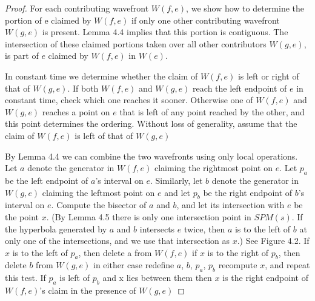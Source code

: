 \begin{proof}
	For each contributing wavefront $W(f,e)$, we show how to determine the
	portion of e claimed by $W(f,e)$ if only one other contributing wavefront
	$W(g,e)$ is present. Lemma 4.4 implies that this portion is contiguous. The
	intersection of these  claimed portions taken over all other contributors
	$W(g,e)$, is part of $e$ claimed by $W(f,e)$ in $W(e)$.

	In constant time we determine whether the claim of $W(f,e)$ is left or right
	of that of $W(g,e)$. If both $W(f,e)$ and $W(g,e)$ reach the left endpoint
	of $e$ in constant time, check which one reaches it sooner. Otherwise one of
	$W(f,e)$ and $W(g,e)$ reaches a point on $e$ that is left of any point
	reached by the other, and this point determines the ordering. Without loss
	of generality, assume that the claim of $W(f,e)$ is left of that of $W(g,e)$

	By Lemma 4.4 we can combine the two wavefronts using only local operations.
	Let $a$ denote the generator in $W(f,e)$ claiming the rightmost point on
	$e$. Let $p_a$ be the left endpoint of $a$'s interval on $e$. Similarly, let
	$b$ denote the generator in $W(g,e)$ claiming the leftmost point on $e$ and
	let $p_b$ be the right endpoint of $b$'s interval on $e$. Compute the
	bisector of $a$ and $b$, and let its intersection with $e$ be the point $x$.
	(By Lemma 4.5 there is only one intersection point in $SPM(s)$. If the
	hyperbola generated by $a$ and $b$ intersects $e$ twice, then $a$ is to the
	left of $b$ at only one of the intersections, and we use that intersection
	as $x$.) See Figure 4.2. If $x$ is to the left of $p_a$, then delete a from
	$W(f,e)$ if $x$ is to the right of $p_b$, then delete $b$ from $W(g,e)$ in
	either case redefine $a$, $b$, $p_a$, $p_b$ recompute $x$, and repeat this
	test. If $p_a$ is left of $p_b$ and x lies between them then $x$ is the
	right endpoint of $W(f,e)$'s claim in the presence of $W(g,e)$
	

\end{proof}
